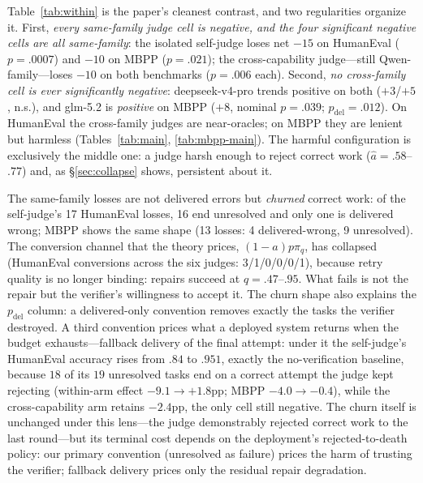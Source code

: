 \documentclass[10pt]{article}
\begin{document}
Table~\ref{tab:within} is the paper's cleanest contrast, and two
regularities organize it.  First, \emph{every same-family judge
cell is negative, and the four significant negative cells are all
same-family}: the isolated self-judge loses net $-15$ on HumanEval
($p = .0007$) and $-10$ on MBPP ($p = .021$); the
cross-capability judge---still Qwen-family---loses $-10$ on both
benchmarks ($p = .006$ each).  Second, \emph{no cross-family cell
is ever significantly negative}: deepseek-v4-pro trends positive on
both ($+3$/$+5$, n.s.), and glm-5.2 is \emph{positive} on MBPP
($+8$, nominal $p = .039$; $p_{\mathrm{del}} = .012$).  On
HumanEval the cross-family judges are near-oracles; on MBPP they
are lenient but harmless (Tables~\ref{tab:main},
\ref{tab:mbpp-main}).  The
harmful configuration is exclusively the middle one: a judge harsh
enough to reject correct work ($\hat a = .58$--$.77$) and, as
§\ref{sec:collapse} shows, persistent about it.

The same-family losses are not delivered errors but \emph{churned}
correct work: of the self-judge's 17 HumanEval losses, 16 end
unresolved and only one is delivered wrong; MBPP shows the same
shape (13 losses: 4
delivered-wrong, 9 unresolved).  The conversion channel that the
theory prices, $(1-a)p\pi_q$, has collapsed (HumanEval conversions
across the six judges: 3/1/0/0/0/1), because retry quality is no
longer binding: repairs succeed at $\hat q = .47$--$.95$.  What
fails is not the repair but the verifier's willingness to accept
it.  The churn shape also explains the $p_{\mathrm{del}}$ column:
a delivered-only convention removes exactly the tasks the
verifier destroyed.  A third convention prices what a deployed
system returns when the budget exhausts---fallback delivery of
the final attempt: under it the self-judge's HumanEval accuracy
rises from $.84$ to $.951$, exactly the no-verification baseline,
because $18$ of its $19$ unresolved tasks end on a correct
attempt the judge kept rejecting (within-arm effect $-9.1 \to
+1.8$pp; MBPP $-4.0 \to -0.4$), while the cross-capability arm
retains $-2.4$pp, the only cell still negative.  The churn
itself is unchanged under this lens---the judge demonstrably
rejected correct work to the last round---but its terminal cost
depends on the deployment's rejected-to-death policy: our primary
convention (unresolved as failure) prices the harm of trusting
the verifier; fallback delivery prices only the residual repair
degradation.
\end{document}
